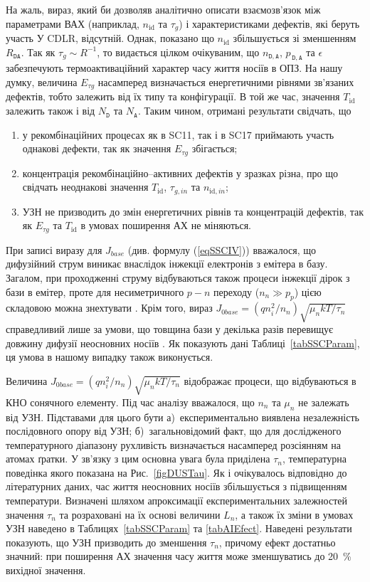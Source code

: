 На жаль, вираз, який би дозволяв аналітично описати взаємозв'язок між параметрами ВАХ (наприклад, $n_{\mathrm{id}}$ та $\tau_g$)
і характеристиками дефектів, які беруть участь У CDLR, відсутній.
Однак, показано \cite{CDLR:JAP1995,CDLR:SSP} що $n_{\mathrm{id}}$ збільшується зі зменшенням $R_{\mathtt{DA}}$.
Так як $\tau_g\sim R^{-1}$,
то видається цілком очікуваним, що $n_{\mathtt{D,A}}$, $p_{\,\mathtt{D,A}}$ та $\epsilon$ забезпечують термоактиваційний характер часу життя носіїв в ОПЗ.
На нашу думку, величина $E_{\tau g}$ насамперед визначається енергетичними рівнями зв'язаних дефектів, тобто
залежить від їх типу та конфігурації.
В той же час, значення $T_\mathrm{id}$ залежить також і від $N_\mathtt{D}$ та $N_\mathtt{A}$.
Таким чином, отримані результати свідчать, що
\begin{enumerate}[label=\asbuk*),leftmargin=0em,itemindent=1.5em]
\item у рекомбінаційних процесах як в SC11, так і в SC17 приймають участь однакові дефекти, так як значення $E_{\tau g}$ збігається;
\item концентрація рекомбінаційно--активних дефектів у зразках різна, про що свідчать неоднакові значення $T_\mathrm{id}$, $\tau_{g,in}$ та $n_{\mathrm{id},in}$;
\item УЗН не призводить до змін енергетичних рівнів та концентрацій дефектів, так як  $E_{\tau g}$ та $T_\mathrm{id}$ в умовах поширення АХ не міняються.
\end{enumerate}

При записі виразу для $J_{base}$ (див. формулу (\ref{eqSSCIV})) вважалося, що дифузійний струм виникає внаслідок інжекції
електронів з емітера в базу.
Загалом, при проходженні струму відбуваються також процеси інжекції дірок з бази в емітер, проте для несиметричного $p-n$ переходу
($n_n\gg p_p$) цією складовою можна знехтувати \cite{Breitenstein2013}.
Крім того, вираз $J_{0base}=(qn_i^2/n_n)\sqrt{\mu_nkT/\tau_n}$ справедливий лише за умови, що товщина бази у декілька разів перевищує
довжину дифузії неосновних носіїв \cite{Sze2012}.
Як показують дані Таблиці~\ref{tabSSCParam}, ця умова в нашому випадку також виконується.

Величина $J_{0base}=(qn_i^2/n_n)\sqrt{\mu_nkT/\tau_n}$ відображає процеси, що відбуваються в КНО сонячного елементу.
Під час аналізу  вважалося, що $n_n$ та $\mu_n$ не залежать від УЗН.
Підставами для цього бути
а)~експериментально виявлена незалежність послідовного опору від УЗН;
б)~загальновідомий факт, що для дослідженого температурного діапазону рухливість визначається насамперед розсіянням на атомах ґратки.
У зв'язку з цим основна увага була приділена $\tau_n$, температурна поведінка якого показана на Рис.~\ref{figDUSTau}.
Як і очікувалось відповідно до літературних даних, час життя неосновних носіїв збільшується з підвищенням температури.
Визначені шляхом апроксимації експериментальних залежностей значення $\tau_n$ та розраховані на їх основі величини $L_n$,
а також їх зміни в умовах УЗН наведено в Таблицях~\ref{tabSSCParam} та \ref{tabAIEfect}.
Наведені результати показують, що УЗН призводить до зменшення $\tau_n$, причому ефект достатньо значний:
при поширення АХ значення часу життя може зменшуватись до 20~\% вихідної значення.


